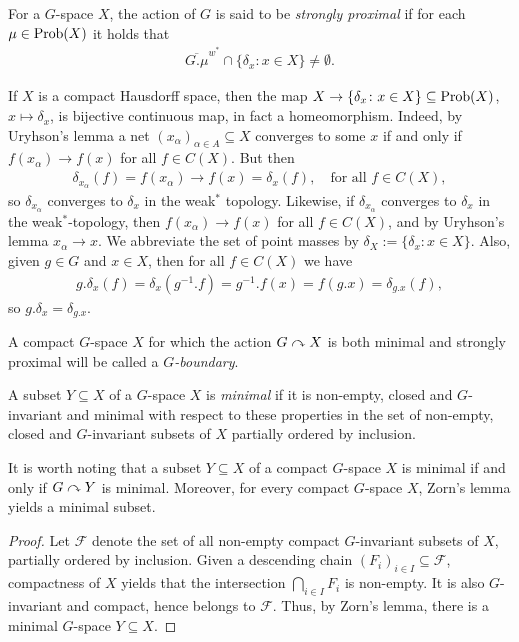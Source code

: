 \begin{definition}\label{Sprox}
For a $G$-space $X$, the action of $G$ is said to be \emph{strongly proximal} if for each $\mu \in \operatorname{Prob}(X)$ it holds that
\begin{align*}
\overline{G.\mu}^{w^*} \cap \{ \delta_{x} \colon x \in X\} \neq \emptyset.
\end{align*}
\end{definition} 
\noindent If $X$ is a compact Hausdorff space, then the map $X \to \{\delta_x \colon x \in X\} \subseteq \operatorname{Prob}(X)$, $x \mapsto \delta_{x}$, is bijective continuous map, in fact a homeomorphism. Indeed, by Uryhson's lemma a net $(x_{\alpha})_{\alpha \in A} \subseteq X$ converges to some $x$ if and only if $f(x_{\alpha}) \to f(x)$ for all $f \in C(X)$. But then 
\begin{align*}
\delta_{x_\alpha}(f)=f(x_{\alpha}) \to f(x) = \delta_{x}(f), \quad \text{for all } f \in C(X),
\end{align*}
so $\delta_{x_{\alpha}}$ converges to $\delta_{x}$ in the weak$^*$ topology. Likewise, if $\delta_{x_{\alpha}}$ converges to $\delta_{x}$ in the weak$^*$-topology, then $f(x_{\alpha}) \to f(x)$ for all $f \in C(X)$, and by Uryhson's lemma $x_{\alpha} \to x$. We abbreviate the set of point masses by $\delta_X := \{\delta_x \colon x \in X\}$. Also, given $g \in G$ and $x \in X$, then for all $f \in C(X)$ we have
\begin{align*}
g.\delta_x(f)=\delta_x(g^{-1}.f)=g^{-1}.f(x)=f(g.x)=\delta_{g.x}(f),
\end{align*}
so $g.\delta_x=\delta_{g.x}$.
\begin{definition}
A compact $G$-space $X$ for which the action $G \curvearrowright X$ is both minimal and strongly proximal will be called a \emph{$G$-boundary}.
\end{definition}

\begin{definition}
A subset $Y \subseteq X$ of a $G$-space $X$ is \emph{minimal} if it is non-empty, closed and $G$-invariant and minimal with respect to these properties in the set of non-empty, closed and $G$-invariant subsets of $X$ partially ordered by inclusion.
\end{definition}

\begin{remark}\label{zorn}
It is worth noting that a subset $Y \subseteq X$ of a compact $G$-space $X$ is minimal if and only if $G \curvearrowright Y$ is minimal. Moreover, for every compact $G$-space $X$, Zorn's lemma yields a minimal subset. 
\begin{proof}
Let $\mathcal{F}$ denote the set of all non-empty compact $G$-invariant subsets of $X$, partially ordered by inclusion. Given a descending chain $(F_{i})_{i \in I} \subseteq \mathcal{F}$, compactness of $X$ yields that the intersection $\bigcap_{i \in I}F_{i}$ is non-empty. It is also $G$-invariant and compact, hence belongs to $\mathcal{F}$. Thus, by Zorn's lemma, there is a minimal $G$-space $Y \subseteq X$.
\end{proof}
\end{remark}

